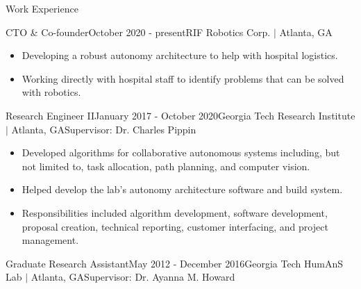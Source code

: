 \documentclass{resume} %
\newcommand{\sectionspace}{\vspace{3mm}}
\begin{document}

\sectionspace
\begin{rSection}{Work Experience}

\begin{rSubsection}{CTO \& Co-founder}{October 2020 - present}{RIF Robotics Corp. $\vert$ Atlanta, GA}{}

\item
\begin{itemize}
\item Developing a robust autonomy architecture to help with hospital logistics.

\item Working directly with hospital staff to identify problems that can be
  solved with robotics.

\end{itemize}

\end{rSubsection}


\begin{rSubsection}{Research Engineer II}{January 2017 - October 2020}{Georgia Tech Research Institute $\vert$ Atlanta, GA}{Supervisor: Dr. Charles Pippin}

\item
\begin{itemize}
\item Developed algorithms for collaborative autonomous systems including, but
  not limited to, task allocation, path planning, and computer vision.

\item Helped develop the lab’s autonomy architecture software and build system.

\item Responsibilities included algorithm development, software development,
  proposal creation, technical reporting, customer interfacing, and project
  management.

\end{itemize}

\end{rSubsection}


\begin{rSubsection}{Graduate Research Assistant}{May 2012 - December 2016}{Georgia Tech HumAnS Lab $\vert$ Atlanta, GA}{Supervisor: Dr. Ayanna M. Howard}


\end{rSubsection}
\end{rSection}
\end{document}
